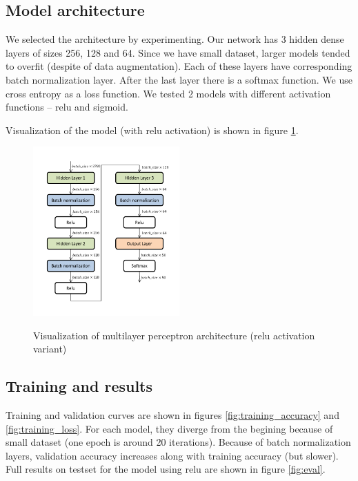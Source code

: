 \documentclass[a4paper]{article}
\begin{document}
\begin{multicols}{2}
\subsection{Model architecture}
We selected the architecture by experimenting.
Our network has 3 hidden dense layers of sizes 256, 128 and 64.
Since we have small dataset, larger models tended to overfit
(despite of data augmentation).
Each of these layers have corresponding batch normalization\cite{Batchnorm} layer.
After the last layer there is a softmax function.
We use cross entropy as a loss function.
We tested 2 models with different activation functions -- relu and sigmoid.

Visualization of the model (with relu activation) is shown in figure \ref{fig:arch}.

\begin{figure}[H]
    \caption[]{Visualization of multilayer perceptron architecture (relu activation variant)}
    \centering
    \includegraphics[page=1,width=0.5\textwidth]{architecture.pdf}
    \label{fig:arch}
\end{figure}


\subsection{Training and results}
Training and validation curves are shown in figures \ref{fig:training_accuracy} and \ref{fig:training_loss}.
For each model, they diverge from the begining because of small dataset (one epoch is around 20 iterations).
Because of batch normalization\cite{Batchnorm} layers, validation accuracy increases along with training accuracy (but slower).
Full results on testset for the model using relu are shown in figure \ref{fig:eval}.


\end{multicols}
\end{document}
